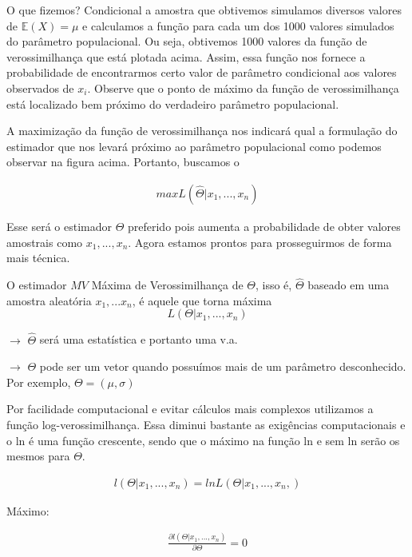 \documentclass[
  letterpaper,
  DIV=11,
  numbers=noendperiod]{scrartcl}
\begin{document}
O que fizemos? Condicional a amostra que obtivemos simulamos diversos
valores de \(\mathbb{E}(X)=\mu\) e calculamos a função para cada um dos
1000 valores simulados do parâmetro populacional. Ou seja, obtivemos
1000 valores da função de verossimilhança que está plotada acima. Assim,
essa função nos fornece a probabilidade de encontrarmos certo valor de
parâmetro condicional aos valores observados de \(x_i\). Observe que o
ponto de máximo da função de verossimilhança está localizado bem próximo
do verdadeiro parâmetro populacional.

A maximização da função de verossimilhança nos indicará qual a
formulação do estimador que nos levará próximo ao parâmetro populacional
como podemos observar na figura acima. Portanto, buscamos o

\[\begin{array}{ccc}
max L(\hat{\Theta}|x_1,...,x_n)
\end{array}\]

Esse será o estimador \(\hat{\Theta}\) preferido pois aumenta a
probabilidade de obter valores amostrais como \(x_1,...,x_n\). Agora
estamos prontos para prosseguirmos de forma mais técnica.

\begin{definicao}

O estimador \(MV\) Máxima de Verossimilhança de \(\Theta\), isso é,
\(\hat{\Theta}\) baseado em uma amostra aleatória \(x_1,...x_n\), é
aquele que torna máxima \[L(\Theta|x_1,...,x_n)\]

\(\rightarrow\) \(\hat{\Theta}\) será uma estatística e portanto uma
v.a.

\(\rightarrow\) \(\Theta\) pode ser um vetor quando possuímos mais de um
parâmetro desconhecido. Por exemplo, \(\Theta=(\mu,\sigma)\)

\end{definicao}

Por facilidade computacional e evitar cálculos mais complexos utilizamos
a função log-verossimilhança. Essa diminui bastante as exigências
computacionais e o ln é uma função crescente, sendo que o máximo na
função ln e sem ln serão os mesmos para \(\Theta\).

\[\begin{array}{ccc}
l(\Theta| x_1,...,x_n) = lnL(\Theta|x_1,...,x_n,)
\end{array}\]

Máximo:

\[\begin{array}{ccc}
\frac{\partial l(\Theta| x_1,...,x_n)}{\partial \Theta} = 0
\end{array}\]
\end{document}
